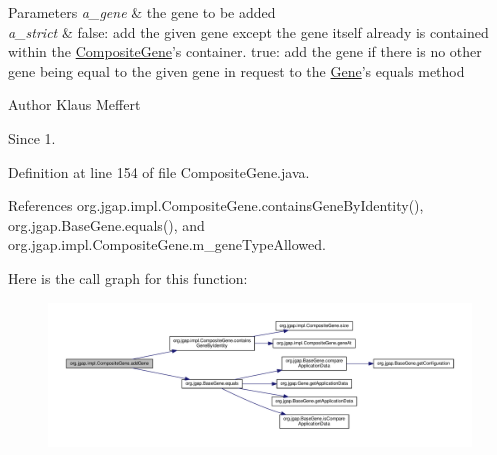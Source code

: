 \begin{DoxyParams}{Parameters}
{\em a\-\_\-gene} & the gene to be added \\
\hline
{\em a\-\_\-strict} & false\-: add the given gene except the gene itself already is contained within the \hyperlink{classorg_1_1jgap_1_1impl_1_1_composite_gene}{Composite\-Gene}'s container. true\-: add the gene if there is no other gene being equal to the given gene in request to the \hyperlink{interfaceorg_1_1jgap_1_1_gene}{Gene}'s equals method\\
\hline
\end{DoxyParams}
\begin{DoxyAuthor}{Author}
Klaus Meffert 
\end{DoxyAuthor}
\begin{DoxySince}{Since}
1. 
\end{DoxySince}


Definition at line 154 of file Composite\-Gene.\-java.



References org.\-jgap.\-impl.\-Composite\-Gene.\-contains\-Gene\-By\-Identity(), org.\-jgap.\-Base\-Gene.\-equals(), and org.\-jgap.\-impl.\-Composite\-Gene.\-m\-\_\-gene\-Type\-Allowed.



Here is the call graph for this function\-:
\nopagebreak
\begin{figure}[H]
\begin{center}
\leavevmode
\includegraphics[width=350pt]{classorg_1_1jgap_1_1impl_1_1_composite_gene_ac8b7dd5b3d2fb4ade4e9d5c95ad4e719_cgraph}
\end{center}
\end{figure}


